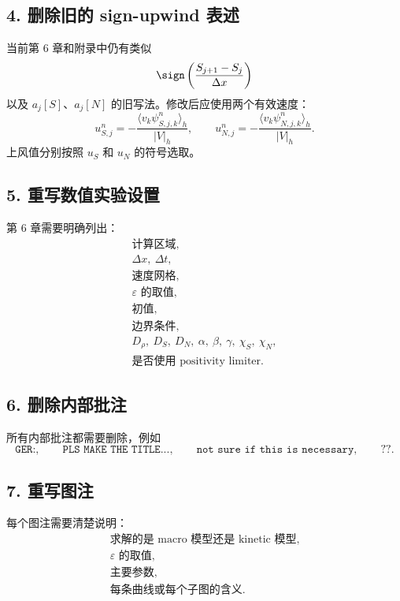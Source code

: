 \subsection*{4. 删除旧的 sign-upwind 表述}

当前第 6 章和附录中仍有类似
\[
\sign\left(\frac{S_{j+1}-S_j}{\Delta x}\right)
\]
以及 \(a_j[S]\)、\(a_j[N]\) 的旧写法。修改后应使用两个有效速度：
\[
u_{S,j}^n
=
-\frac{\langle v_k\psi_{S,j,k}^n\rangle_h}{|V|_h},
\qquad
u_{N,j}^n
=
-\frac{\langle v_k\psi_{N,j,k}^n\rangle_h}{|V|_h}.
\]
上风值分别按照 \(u_S\) 和 \(u_N\) 的符号选取。

\subsection*{5. 重写数值实验设置}

第 6 章需要明确列出：
\[
\begin{array}{l}
\text{计算区域},\\
\Delta x,\ \Delta t,\\
\text{速度网格},\\
\varepsilon \text{ 的取值},\\
\text{初值},\\
\text{边界条件},\\
D_\rho,\ D_S,\ D_N,\ \alpha,\ \beta,\ \gamma,\ \chi_S,\ \chi_N,\\
\text{是否使用 positivity limiter}.
\end{array}
\]

\subsection*{6. 删除内部批注}

所有内部批注都需要删除，例如
\[
\texttt{GER:},\qquad
\texttt{PLS MAKE THE TITLE...},\qquad
\texttt{not sure if this is necessary},\qquad
\texttt{??}.
\]

\subsection*{7. 重写图注}

每个图注需要清楚说明：
\[
\begin{array}{l}
\text{求解的是 macro 模型还是 kinetic 模型},\\
\varepsilon \text{ 的取值},\\
\text{主要参数},\\
\text{每条曲线或每个子图的含义}.
\end{array}
\]

